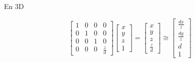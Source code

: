 \documentclass[compress]{beamer}
\begin{document}
\begin{frame}{En 3D}
    \begin{center}
\[
    \begin{bmatrix} 1 & 0 & 0 & 0\\ 
                    0 & 1 & 0 & 0\\
                    0 & 0 & 1 & 0 \\
                    0 & 0 & 0 & \frac{z}{d}
\end{bmatrix} \begin{bmatrix} x \\ y \\ z \\ 1 \end{bmatrix}
= \begin{bmatrix} x \\ y \\ z \\ \frac{z}{d} \end{bmatrix} 
\cong \begin{bmatrix} \frac{dx}{z} \\ \frac{dy}{z} \\ d \\ 1 \end{bmatrix} 
\]

\end{center}

\end{frame}
\end{document}
